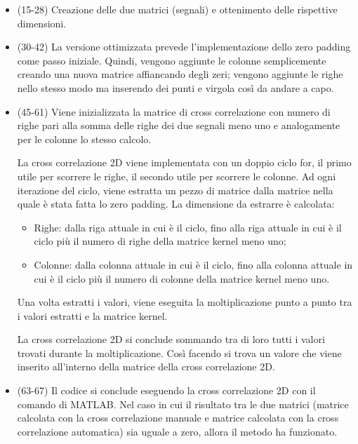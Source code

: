 \documentclass[a4paper]{article}
\begin{document}
	\begin{itemize}
		\item (15-28) Creazione delle due matrici (segnali) e ottenimento delle rispettive dimensioni.
		
		\item (30-42) La versione ottimizzata prevede l'implementazione dello zero padding come passo iniziale. Quindi, vengono aggiunte le colonne semplicemente creando una nuova matrice affiancando degli zeri; vengono aggiunte le righe nello stesso modo ma inserendo dei punti e virgola così da andare a capo.
		
		\item (45-61) Viene inizializzata la matrice di cross correlazione con numero di righe pari alla somma delle righe dei due segnali meno uno e analogamente per le colonne lo stesso calcolo.
		
		La cross correlazione 2D viene implementata con un doppio ciclo for, il primo utile per scorrere le righe, il secondo utile per scorrere le colonne. Ad ogni iterazione del ciclo, viene estratta un pezzo di matrice dalla matrice nella quale è stata fatta lo zero padding. La dimensione da estrarre è calcolata:
		\begin{itemize}
			\item Righe: dalla riga attuale in cui è il ciclo, fino alla riga attuale in cui è il ciclo più il numero di righe della matrice kernel meno uno;
			
			\item Colonne: dalla colonna attuale in cui è il ciclo, fino alla colonna attuale in cui è il ciclo più il numero di colonne della matrice kernel meno uno.
		\end{itemize}
		
		Una volta estratti i valori, viene eseguita la moltiplicazione punto a punto tra i valori estratti e la matrice kernel.
		
		La cross correlazione 2D si conclude sommando tra di loro tutti i valori trovati durante la moltiplicazione. Così facendo si trova un valore che viene inserito all'interno della matrice della cross correlazione 2D.
		
		\item (63-67) Il codice si conclude eseguendo la cross correlazione 2D con il comando di MATLAB. Nel caso in cui il risultato tra le due matrici (matrice calcolata con la cross correlazione manuale e matrice calcolata con la cross correlazione automatica) sia uguale a zero, allora il metodo ha funzionato.
	\end{itemize}\newpage
	
\end{document}
